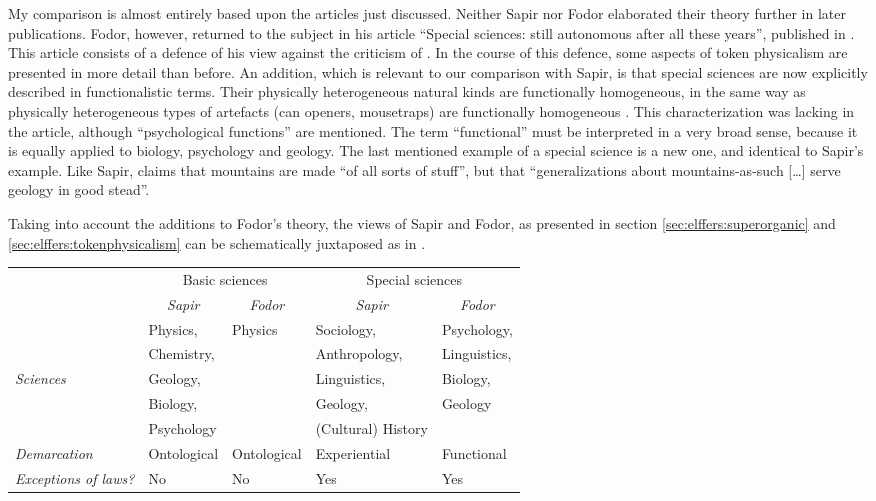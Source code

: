 \documentclass[output=paper]{langscibook}
\begin{document}
My comparison is almost entirely based upon the articles just discussed. Neither Sapir nor Fodor elaborated their theory further in later publications. Fodor, however, returned to the subject in his article ``Special sciences: still autonomous after all these years'', published in \citeyear{Fodor1997}. This article consists of a defence of his view against the criticism of \citet{Kim1992}. In the course of this defence, some aspects of token physicalism are presented in more detail than before. An addition, which is relevant to our comparison with Sapir, is that special sciences are now explicitly described in functionalistic terms. Their physically heterogeneous natural kinds are functionally homogeneous, in the same way as physically heterogeneous types of artefacts (can openers, mousetraps) are functionally homogeneous \citet[160]{Fodor1997}. This characterization was lacking in the \citeyear{Fodor1974} article, although ``psychological functions'' are mentioned. The term ``functional'' must be interpreted in a very broad sense, because it is equally applied to biology, psychology and geology. The last mentioned example of a special science is a new one, and identical to Sapir's example. Like Sapir, \citet[160]{Fodor1997} claims that mountains are made ``of all sorts of stuff'', but that ``generalizations about mountains-as-such […] serve geology in good stead''.

Taking into account the \citeyear{Fodor1997} additions to Fodor's theory, the views of Sapir and Fodor, as presented in section \ref{sec:elffers:superorganic} and \ref{sec:elffers:tokenphysicalism} can be schematically juxtaposed as in .

\begin{table}
\label{tab:elffers:sciences}
\begin{tabular}{p{1.8cm} p{2.2cm} p{2.2cm} p{2.2cm} p{2.2cm}}
  \multirow{2}{*}{ } & \multicolumn{2}{c}{Basic sciences} & \multicolumn{2}{c}{Special sciences} \\
  & \multicolumn{1}{c}{\emph{Sapir}} & \multicolumn{1}{c}{\emph{Fodor}} & \multicolumn{1}{c}{\emph{Sapir}} & \multicolumn{1}{c}{\emph{Fodor}} \\ \hline
  & Physics, & Physics & Sociology, & Psychology, \\
  & Chemistry, & & Anthropology, & Linguistics, \\
  \emph{Sciences} & Geology, & & Linguistics, & Biology, \\
  & Biology, & & Geology, & Geology  \\
  & Psychology & & {(}Cultural{)} History & \\ \hline
 
 \emph{Demarcation} & Ontological & Ontological & Experiential & Functional \\ \hline
 
 \emph{Exceptions of laws?} & No & No & Yes & Yes \\
\end{tabular}
\end{table}
\end{document}
